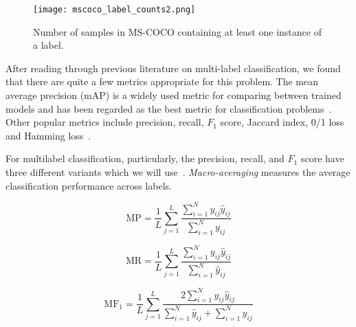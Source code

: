 \documentclass[12pt,journal,compsoc]{IEEEtran}
\begin{document}
\begin{figure}[!t]
\normalsize
\texttt{[image: mscoco\_label\_counts2.png]}
\caption{Number of samples in MS-COCO containing at least one instance of a label.}
\label{coco_label_counts}
\vspace*{4pt}
\end{figure}



After reading through previous literature on multi-label classification, we found that there are quite a few metrics appropriate for this problem. The mean average precision (mAP) is a widely used metric for comparing between trained models and has been regarded as the best metric for classification problems~\cite{Lavrenko_2014}.  Other popular metrics include precision, recall, $F_1$ score, Jaccard index, 0/1 loss and Hamming loss~\cite{Tsoumakas:2007,SOKOLOVA2009427,Herrera:2016}. 

For multilabel classification, particularly, the precision, recall, and $F_1$ score have three different variants which we will use~\cite{MADJAROV20123084,WuZ16,Koyejo:2015,GongJLTI13}. \textit{Macro-averaging} measures the average classification performance across labels.  

\begin{equation}
\mathrm{MP} = \frac{1}{L}\sum_{j=1}^{L}\frac{\sum_{i=1}^{N}y_{ij}\hat{y}_{ij}}{\sum_{i=1}^{N}y_{ij}}
\label{eq:MP}
\end{equation}

\begin{equation}
\mathrm{MR} = \frac{1}{L}\sum_{j=1}^{L}\frac{\sum_{i=1}^{N}y_{ij}\hat{y}_{ij}}{\sum_{i=1}^{N}\hat{y}_{ij}}
\label{eq:MR}
\end{equation}

\begin{equation}
\mathrm{MF_1} = \frac{1}{L}\sum_{j=1}^{L}\frac{2\sum_{i=1}^{N}y_{ij}\hat{y}_{ij}}{\sum_{i=1}^{N}\hat{y}_{ij}+\sum_{i=1}^{N}y_{ij}}
\label{eq:MF1}
\end{equation}
\end{document}
